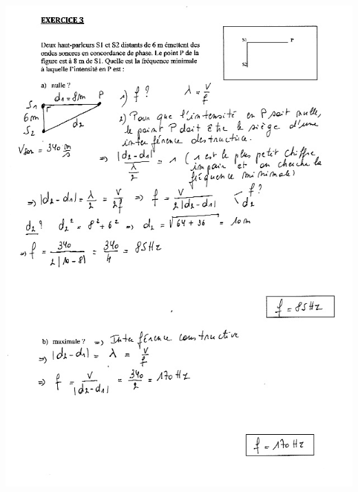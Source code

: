 {\includegraphics[width=18.253cm,height=25.273cm]{Pictures/100000010000027000000360F8FFC5B3763173F1.png}

}
